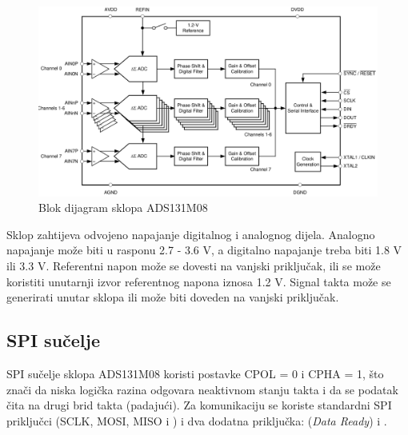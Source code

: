 \begin{figure}[htb]
    \centering
    \includegraphics[width=\textwidth]{slike/ads131m08_blok_dijagram.png}
    \caption{Blok dijagram sklopa ADS131M08 \cite{ads131m08_datasheet}}
    \label{fig:ads131m08_blok_dijagram}
\end{figure}

Sklop zahtijeva odvojeno napajanje digitalnog i analognog dijela. Analogno napajanje može biti u rasponu 2.7 - 3.6 V, a digitalno napajanje treba biti 1.8 V ili 3.3 V. Referentni napon može se dovesti na vanjski priključak, ili se može koristiti unutarnji izvor referentnog napona iznosa 1.2 V. Signal takta može se generirati unutar sklopa ili može biti doveden na vanjski priključak. 

\subsection{SPI sučelje}
SPI sučelje sklopa ADS131M08 koristi postavke CPOL = 0 i CPHA = 1, što znači da niska logička razina odgovara neaktivnom stanju takta i da se podatak čita na drugi brid takta (padajući). Za komunikaciju se koriste standardni SPI priključci (SCLK, MOSI, MISO i ) i dva dodatna priključka:  (\textit{Data Ready}) i .

